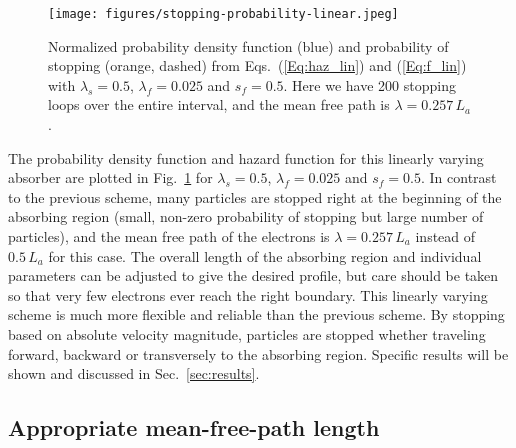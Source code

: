 \documentclass[../absorber.tex]{subfiles}
\begin{document}
\begin{figure}
\texttt{[image: figures/stopping-probability-linear.jpeg]}
\caption{\label{fig:f-and-h-lin} Normalized probability density function (blue) and probability of stopping (orange, dashed) from Eqs.~(\ref{Eq:haz_lin}) and (\ref{Eq:f_lin}) with $\lambda_s=0.5$, $\lambda_f=0.025$ and $s_f=0.5$. Here we have 200 stopping loops over the entire interval, and the mean free path is $\lambda=0.257\,L_a$.}
\end{figure}



The probability density function and hazard function for this linearly varying absorber are plotted in Fig.~\ref{fig:f-and-h-lin} for $\lambda_s=0.5$, $\lambda_f=0.025$ and $s_f=0.5$.  
In contrast to the previous scheme, many particles are stopped right at the beginning of the absorbing region (small, non-zero probability of stopping but large number of particles), and the mean free path of the electrons is $\lambda=0.257\,L_a$ instead of $0.5\,L_a$ for this case.  The overall length of the absorbing region and individual parameters can be adjusted to give the desired profile, but care should be taken so that very few electrons ever reach the right boundary.  This linearly varying scheme is much more flexible and reliable than the previous scheme.  By stopping based on absolute velocity magnitude, particles are stopped whether traveling forward, backward or transversely to the absorbing region.  Specific results will be shown and discussed in Sec.~\ref{sec:results}.

\subsection{Appropriate mean-free-path length} \label{sec:concept-mfp}
\end{document}
